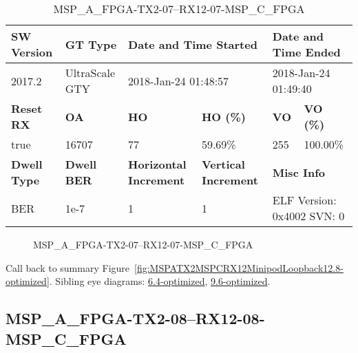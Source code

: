 \begin{table}[h]
\centering
\caption{MSP\_A\_FPGA-TX2-07--RX12-07-MSP\_C\_FPGA}
\label{tab:MSPAFPGATX207RX1207MSPCFPGA12.8-optimized}
\begin{tabular}{@{}|l|l|l|l|l|l|@{}}
\toprule
\textbf{SW Version}                & \textbf{GT Type}   & \multicolumn{2}{l|}{\textbf{Date and Time Started}}            & \multicolumn{2}{l|}{\textbf{Date and Time Ended}}        \\ \midrule
2017.2                       & UltraScale GTY          & \multicolumn{2}{l|}{2018-Jan-24 01:48:57}                   & \multicolumn{2}{l|}{2018-Jan-24 01:49:40}               \\ \midrule
\textbf{Reset RX}                  & \textbf{OA} & \textbf{HO}   & \textbf{HO (\%)} & \textbf{VO} & \textbf{VO (\%)} \\ \midrule
true & 16707        & 77          & 59.69\%        & 255        & 100.00\%       \\ \midrule
\textbf{Dwell Type}                & \textbf{Dwell BER} & \textbf{Horizontal Increment} & \textbf{Vertical Increment}    & \multicolumn{2}{l|}{\textbf{Misc Info}}                  \\ \midrule
BER                            & 1e-7        & 1        & 1           & \multicolumn{2}{l|}{ELF Version: 0x4002 SVN: 0}                         \\ \bottomrule
\end{tabular}
\end{table}

\begin{figure}[h]
\caption{MSP\_A\_FPGA-TX2-07--RX12-07-MSP\_C\_FPGA} \label{fig:MSPAFPGATX207RX1207MSPCFPGA12.8-optimized}
\end{figure}

Call back to summary Figure~\ref{fig:MSPATX2MSPCRX12MinipodLoopback12.8-optimized}.
Sibling eye diagrams: \hyperref[sec:MSPAFPGATX207RX1207MSPCFPGA6.4-optimized]{6.4-optimized}, \hyperref[sec:MSPAFPGATX207RX1207MSPCFPGA9.6-optimized]{9.6-optimized}.

\clearpage
\newpage


\subsection{MSP\_A\_FPGA-TX2-08--RX12-08-MSP\_C\_FPGA}\label{sec:MSPAFPGATX208RX1208MSPCFPGA12.8-optimized}

